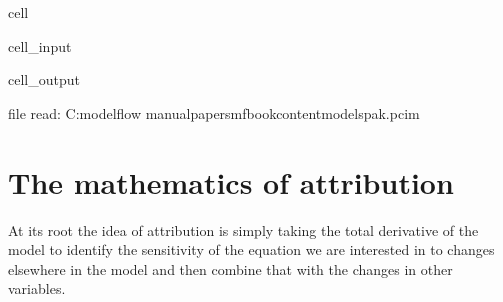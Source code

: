 \documentclass[letterpaper,10pt,english]{jupyterBook}
\begin{document}
\begin{sphinxuseclass}{cell}\begin{sphinxVerbatimInput}

\begin{sphinxuseclass}{cell_input}
\begin{sphinxVerbatim}[commandchars=\\\{\}]
  
    
   
\end{sphinxVerbatim}

\end{sphinxuseclass}\end{sphinxVerbatimInput}
\begin{sphinxVerbatimOutput}

\begin{sphinxuseclass}{cell_output}
\begin{sphinxVerbatim}[commandchars=\\\{\}]
file read:  C:\PYGZbs{}modelflow manual\PYGZbs{}papers\PYGZbs{}mfbook\PYGZbs{}content\PYGZbs{}models\PYGZbs{}pak.pcim
\end{sphinxVerbatim}

\end{sphinxuseclass}\end{sphinxVerbatimOutput}

\end{sphinxuseclass}

\section{The mathematics of attribution}
\label{\detokenize{content/06_ModelAnalytics/Attribution:the-mathematics-of-attribution}}
\sphinxAtStartPar
At its root the idea of attribution is simply taking the total derivative of the model to identify the sensitivity of the equation we are interested in to changes elsewhere in the model and then combine that with the changes in other variables.
\end{document}
